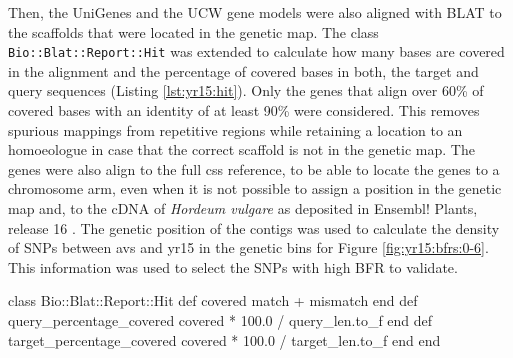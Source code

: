 Then, the UniGenes and the UCW gene models were also aligned with BLAT to the scaffolds that were located in the genetic map.  
The class \texttt{Bio::Blat::Report::Hit}  was extended to calculate how many bases are covered in the alignment and the percentage of covered bases in both, the target and query sequences (Listing \ref{lst:yr15:hit}).
Only the genes that align over 60\% of covered bases with an identity of at least 90\% were considered. 
This removes spurious mappings from repetitive regions while retaining a location to an homoeologue in case that the correct scaffold is not in the genetic map. 
The genes were also align to the full \acrshort{css} reference, to be able to locate the genes to a chromosome arm, even when it is not possible to assign a position in the genetic map and, to the cDNA of \textit{Hordeum vulgare} \citep{Mayer2011} as deposited in Ensembl! Plants, release 16 \citep{Kersey2012}. 
The genetic position of the contigs was used to calculate the density of SNPs between \acrshort{avs} and \acrshort{yr15} in the genetic bins for Figure \ref{fig:yr15:bfrs:0-6}. 
This information was used to select the SNPs with high BFR to validate.  

\begin{code}[language=Ruby, caption=Extension to \texttt{Bio::Blat::Report::Hit} for filtering of spurious alignments., label=lst:yr15:hit]
class Bio::Blat::Report::Hit
  def covered
    match + mismatch
  end
  def query_percentage_covered
    covered * 100.0 / query_len.to_f
  end
  def target_percentage_covered
    covered * 100.0 / target_len.to_f
  end
end
\end{code}

